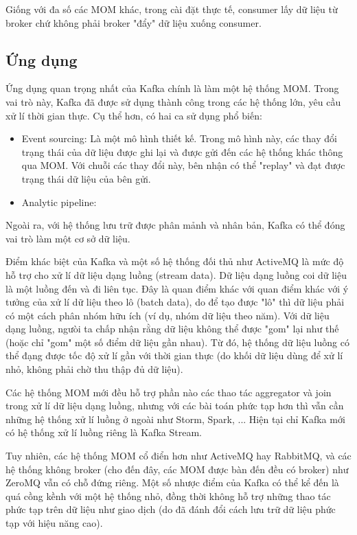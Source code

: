 \documentclass{article}
\begin{document}
Giống với đa số các MOM khác, trong cài đặt thực tế, consumer lấy dữ liệu từ
broker chứ không phải broker "đẩy" dữ liệu xuống consumer.

\subsection{Ứng dụng}

Ứng dụng quan trọng nhất của Kafka chính là làm một hệ thống MOM. Trong vai trò
này, Kafka đã được sử dụng thành công trong các hệ thống lớn, yêu cầu xử lí thời
gian thực. Cụ thể hơn, có hai ca sử dụng phổ biến:

\begin{itemize}
    \item Event sourcing: Là một mô hình thiết kế. Trong mô hình này, các thay
    đổi trạng thái của dữ liệu được ghi lại và được gửi đến các hệ thống khác
    thông qua MOM. Với chuỗi các thay đổi này, bên nhận có thể "replay" và đạt
    được trạng thái dữ liệu của bên gửi.
    \item Analytic pipeline:
\end{itemize}

Ngoài ra, với hệ thống lưu trữ được phân mảnh và nhân bản, Kafka có thể đóng vai
trò làm một cơ sở dữ liệu.

Điểm khác biệt của Kafka và một số hệ thống đối thủ như ActiveMQ là mức độ hỗ
trợ cho xử lí dữ liệu dạng luồng (stream data). Dữ liệu dạng luồng coi dữ liệu
là một luồng đến và đi liên tục. Đây là quan điểm khác với quan điểm khác với ý
tưởng của xử lí dữ liệu theo lô (batch data), do để tạo được "lô" thì dữ liệu
phải có một cách phân nhóm hữu ích (ví dụ, nhóm dữ liệu theo năm). Với dữ liệu
dạng luồng, ngưòi ta chấp nhận rằng dữ liệu không thể được "gom" lại như thế
(hoặc chỉ "gom" một số điểm dữ liệu gần nhau). Từ đó, hệ thống dữ liệu luồng có
thể đạng được tốc độ xử lí gần với thời gian thực (do khối dữ liệu dùng để xử lí
nhỏ, không phải chờ thu thập đủ dữ liệu).

Các hệ thống MOM mới đều hỗ trợ phần nào các thao tác aggregator và join trong
xử lí dữ liệu dạng luồng, nhưng với các bài toán phức tạp hơn thì vẫn cần những
hệ thống xử lí luồng ở ngoài như Storm, Spark, ... Hiện tại chỉ Kafka mới có hệ
thống xử lí luồng riêng là Kafka Stream.

Tuy nhiên, các hệ thống MOM cổ điển hơn như ActiveMQ hay RabbitMQ, và các hệ
thống không broker (cho đến đây, các MOM được bàn đến đều có broker) như ZeroMQ
vẫn có chỗ đứng riêng. Một số nhược điểm của Kafka có thể kể đến là quá cồng
kềnh với một hệ thống nhỏ, đồng thời không hỗ trợ những thao tác phức tạp trên
dữ liệu như giao dịch (do đã đánh đổi cách lưu trữ dữ liệu phức tạp với hiệu
năng cao).
\end{document}
